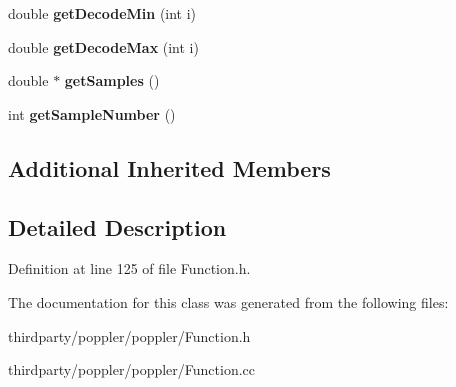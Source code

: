 \begin{DoxyCompactItemize}
double {\bfseries get\+Decode\+Min} (int i)
\item 
\mbox{\label{class_sampled_function_a76f6b509758d9569609fe6a94de38b3e}} 
double {\bfseries get\+Decode\+Max} (int i)
\item 
\mbox{\label{class_sampled_function_a39a45c922451fd75a4adda564073f560}} 
double $\ast$ {\bfseries get\+Samples} ()
\item 
\mbox{\label{class_sampled_function_a0c883b1b6b499becfe49c9fb61269c0e}} 
int {\bfseries get\+Sample\+Number} ()
\end{DoxyCompactItemize}
\subsection*{Additional Inherited Members}


\subsection{Detailed Description}


Definition at line 125 of file Function.\+h.



The documentation for this class was generated from the following files\+:\begin{DoxyCompactItemize}
\item 
thirdparty/poppler/poppler/Function.\+h\item 
thirdparty/poppler/poppler/Function.\+cc\end{DoxyCompactItemize}

